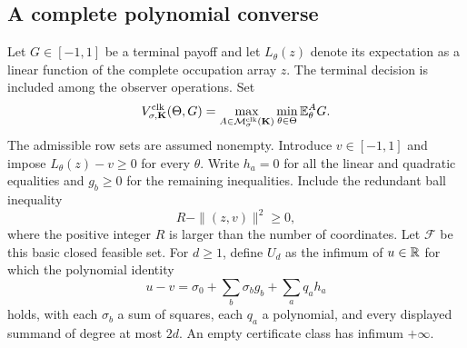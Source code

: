\subsection{A complete polynomial converse}
Let $G\in[-1,1]$ be a terminal payoff and let $L_\theta(z)$ denote its
expectation as a linear function of the complete occupation array $z$.
The terminal decision is included among the observer operations. Set
\begin{equation}\label{eq:v23-value}
 V^{\rm clk}_{\sigma,\mathbf K}(\Theta,G)
 =\max_{A\in\mathcal M^{\rm clk}_\sigma(\mathbf K)}
                              \min_{\theta\in\Theta}\mathbb E_\theta^A G.
\end{equation}
The admissible row sets are assumed nonempty. Introduce $v\in[-1,1]$
and impose $L_\theta(z)-v\ge0$ for every $\theta$. Write $h_a=0$ for
all the linear and quadratic equalities and $g_b\ge0$ for the remaining
inequalities. Include the redundant ball inequality
\[
 R-\|(z,v)\|^2\ge0,
\]
where the positive integer $R$ is larger than the number of coordinates.
Let $\mathcal F$ be this basic closed feasible set. For $d\ge1$, define
$U_d$ as the infimum of $u\in\mathbb R$ for which the polynomial identity
\begin{equation}\label{eq:v23-sos}
 u-v=\sigma_0+\sum_b\sigma_b g_b+\sum_a q_a h_a
\end{equation}
holds, with each $\sigma_b$ a sum of squares, each $q_a$ a polynomial,
and every displayed summand of degree at most $2d$. An empty certificate
class has infimum $+\infty$.

